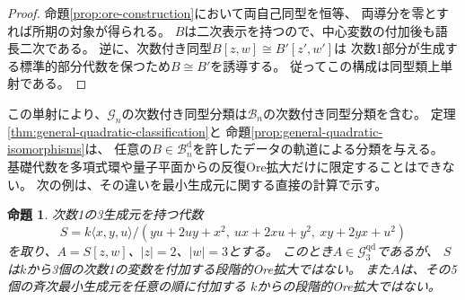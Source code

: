 \documentclass[11pt,a4paper]{ltjsarticle}
\newtheorem{proposition}[theorem]{命題}
\theoremstyle{definition}
\newcommand{\Gclass}{\mathcal G}
\newcommand{\Bclass}{\mathcal B}
\begin{document}
\begin{proof}
命題\ref{prop:ore-construction}において両自己同型を恒等、
両導分を零とすれば所期の対象が得られる。
$B$は二次表示を持つので、中心変数の付加後も語長二次である。
逆に、次数付き同型$B[z,w]\cong B'[z',w']$は
次数1部分が生成する標準的部分代数を保つため$B\cong B'$を誘導する。
従ってこの構成は同型類上単射である。
\end{proof}

この単射により、$\Gclass_n$の次数付き同型分類は$\Bclass_n$の次数付き同型分類を含む。
定理\ref{thm:general-quadratic-classification}と
命題\ref{prop:general-quadratic-isomorphisms}は、
任意の$B\in\Bclass_n^{\mathrm d}$を許したデータの軌道による分類を与える。
基礎代数を多項式環や量子平面からの反復Ore拡大だけに限定することはできない。
次の例は、その違いを最小生成元に関する直接の計算で示す。

\begin{proposition}\label{prop:sklyanin-base}
次数1の3生成元を持つ代数
\[
S=k\langle x,y,u\rangle/
(yu+2uy+x^2,\ ux+2xu+y^2,\ xy+2yx+u^2)
\]
を取り、$A=S[z,w]$、$|z|=2$、$|w|=3$とする。
このとき$A\in\Gclass_3^{\mathrm{qd}}$であるが、
$S$は$k$から3個の次数1の変数を付加する段階的Ore拡大ではない。
また$A$は、その5個の斉次最小生成元を任意の順に付加する
$k$からの段階的Ore拡大ではない。
\end{proposition}
\end{document}
